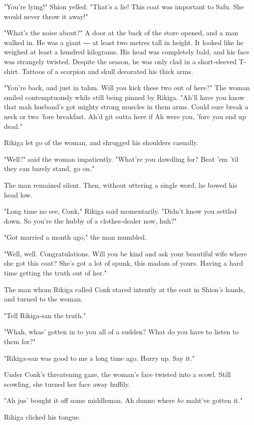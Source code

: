 "You're lying!" Shion yelled. "That's a lie! This coat was important to
Safu. She would never throw it away!"

"What's the noise about?" A door at the back of the store opened, and a
man walked in. He was a giant ― at least two metres tall in height. It
looked like he weighed at least a hundred kilograms. His head was
completely bald, and his face was strangely twisted. Despite the season,
he was only clad in a short-sleeved T-shirt. Tattoos of a scorpion and
skull decorated his thick arms.

"You're back, and just in tahm. Will you kick these two out of here?"
The woman smiled contemptuously while still being pinned by Rikiga.
"Ah'll have you know that mah husband's got mighty strong muscles in
them arms. Could sure break a neck or two 'fore breakfast. Ah'd git
outta here if Ah were you, 'fore you end up dead."

Rikiga let go of the woman, and shrugged his shoulders casually.

"Well?" said the woman impatiently. "What're you dawdling for? Beat 'em
'til they can barely stand, go on."

The man remained silent. Then, without uttering a single word, he bowed
his head low.

"Long time no see, Conk," Rikiga said momentarily. "Didn't know you
settled down. So you're the hubby of a clothes-dealer now, huh?"

"Got married a month ago," the man mumbled.

"Well, well. Congratulations. Will you be kind and ask your beautiful
wife where she got this coat? She's got a lot of spunk, this madam of
yours. Having a hard time getting the truth out of her."

The man whom Rikiga called Conk stared intently at the coat in Shion's
hands, and turned to the woman.

"Tell Rikiga-san the truth."

"Whah, whas' gotten in to you all of a sudden? What do you have to
listen to them for?"

"Rikiga-san was good to me a long time ago. Hurry up. Say it."

Under Conk's threatening gaze, the woman's face twisted into a scowl.
Still scowling, she turned her face away huffily.

"Ah jus' bought it off some middleman. Ah dunno where \emph{he} maht've gotten
it."

Rikiga clicked his tongue.

